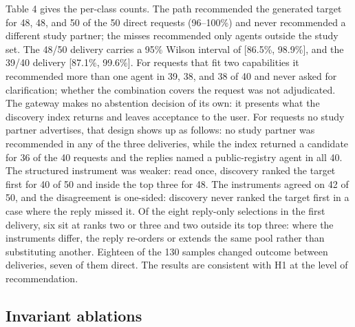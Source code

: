 \documentclass[runningheads,a4paper]{llncs}
\begin{document}
Table 4 gives the per-class counts. The path recommended the generated target for 48, 48, and 50 of the 50 direct requests (96--100\%) and never recommended a different study partner; the misses recommended only agents outside the study set. The 48/50 delivery carries a 95\% Wilson interval of [86.5\%, 98.9\%], and the 39/40 delivery [87.1\%, 99.6\%]. For requests that fit two capabilities it recommended more than one agent in 39, 38, and 38 of 40 and never asked for clarification; whether the combination covers the request was not adjudicated. The gateway makes no abstention decision of its own: it presents what the discovery index returns and leaves acceptance to the user. For requests no study partner advertises, that design shows up as follows: no study partner was recommended in any of the three deliveries, while the index returned a candidate for 36 of the 40 requests and the replies named a public-registry agent in all 40. The structured instrument was weaker: read once, discovery ranked the target first for 40 of 50 and inside the top three for 48. The instruments agreed on 42 of 50, and the disagreement is one-sided: discovery never ranked the target first in a case where the reply missed it. Of the eight reply-only selections in the first delivery, six sit at ranks two or three and two outside its top three: where the instruments differ, the reply re-orders or extends the same pool rather than substituting another. Eighteen of the 130 samples changed outcome between deliveries, seven of them direct. The results are consistent with H1 at the level of recommendation.

\subsection{Invariant ablations}
\end{document}
